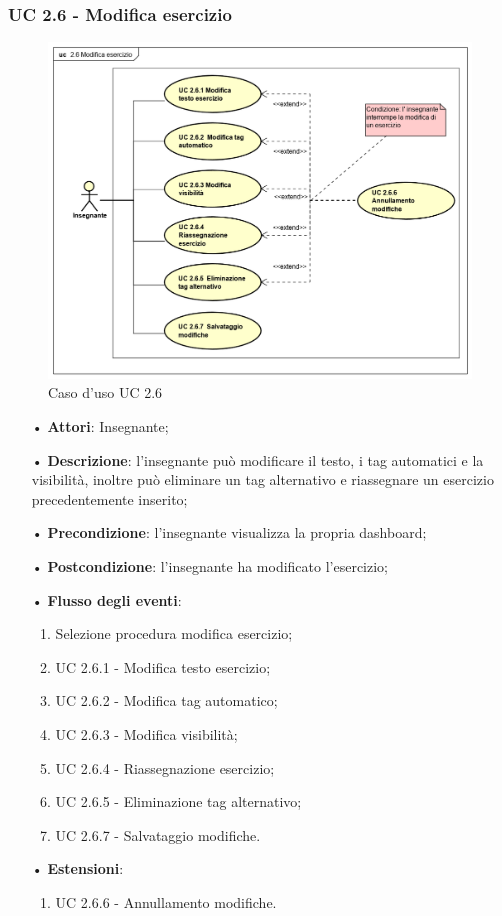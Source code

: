 \subsubsection{UC 2.6 - Modifica esercizio}
\begin{figure}[H]
\centering
\includegraphics[width=17cm]{img/Modifica_esercizio.png} 
\caption{Caso d'uso UC 2.6}
\end{figure}

\begin{itemize}
	\item[•] \textbf{Attori}: Insegnante;
	\item[•] \textbf{Descrizione}: l'insegnante può modificare il testo, i tag automatici e la visibilità, inoltre può eliminare un tag alternativo e riassegnare un esercizio precedentemente inserito;
	\item[•] \textbf{Precondizione}:  l'insegnante visualizza la propria dashboard;
	\item[•] \textbf{Postcondizione}: l'insegnante ha modificato l'esercizio;
	\item[•] \textbf{Flusso degli eventi}:
	\begin{enumerate}
		\item Selezione procedura modifica esercizio;
		\item UC 2.6.1 - Modifica testo esercizio;
		\item UC 2.6.2 - Modifica tag automatico;
		\item UC 2.6.3 - Modifica visibilità;
		\item UC 2.6.4 - Riassegnazione esercizio;
		\item UC 2.6.5 - Eliminazione tag alternativo;
		\item UC 2.6.7 - Salvataggio modifiche.
	\end{enumerate}
	\item[•] \textbf{Estensioni}:	
	\begin{enumerate}
		\item UC 2.6.6 - Annullamento modifiche.
	\end{enumerate}
\end{itemize}


